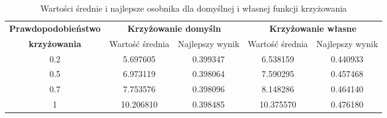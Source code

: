 \begin{table}[!h]
	\centering
	\caption{Wartości średnie i najlepsze osobnika dla domyślnej i własnej funkcji krzyżowania}
	\label{cross_porownanie}
	\hspace*{-0.5in}
	\begin{tabular}{|c|c|c|c|c|}
		\hline
		\textbf{Prawdopodobieństwo} & \multicolumn{2}{c}{\textbf{Krzyżowanie domyśln}}  & \multicolumn{2}{|c|}{\textbf{Krzyżowanie własne}} \\ \cline{2-5}
		\textbf{krzyżowania} & Wartość średnia & Najlepszy wynik & Wartość średnia & Najlepszy wynik \\ \hline
		
		0.2 & 5.697605 & 0.399347 & 6.538159 & 0.440933 \\
		0.5 & 6.973119 & 0.398064 & 7.590295 & 0.457468 \\
		0.7 & 7.753576 & 0.398096 & 8.148286 & 0.464140 \\
		1   & 10.206810 & 0.398485 & 10.375570 & 0.476180  \\ \hline      
	\end{tabular}
\end{table}
